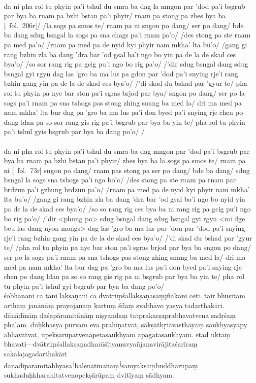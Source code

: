 \documentclass[12pt]{article}
\newcommand{\crux} {\hspace{0em}\textsuperscript{†}\hspace{0em}}
\newcommand{\emdash} {\hspace{0em}—\hspace{0em}}
\begin{document}
\textbf{\TVA}\\
da ni pha rol tu phyin pa'i tshul du smra ba dag la mngon par 'dod pa'i bsgrub par bya ba rnam pa bzhi bstan pa'i phyir/ rnam pa stong pa zhes bya ba [\TVA\ fol.\ 206r]/ /la sogs pa smos te/ rnam pa ni sngon po dang/ ser po dang/ bde ba dang sdug bsngal la sogs pa sna chags pa'i rnam pa'o/ /des stong pa ste rnam pa med pa'o/ /rnam pa med pa de nyid kyi phyir nam mkha' lta bu'o/ /gang gi rang bzhin zla ba dang 'dra bar 'od gsal ba'i ngo bo yin pa de la de skad ces bya'o/ /so sor rang rig pa gcig pu'i ngo bo rig pa'o/ /'dir sdug bsngal dang sdug bsngal gyi rgyu dag las 'gro ba ma lus pa gdon par 'dod pa'i snying rje'i rang bzhin gang yin pa de la de skad ces bya'o/ /'di skad du bshad par 'gyur te/ pha rol tu phyin pa nye bar ston pa'i sgras brjod par bya/ sngon po dang/ ser po la sogs pa'i rnam pa sna tshogs pas stong zhing snang ba med la/ dri ma med pa nam mkha' lta bur dag pa 'gro ba ma lus pa'i don byed pa'i snying rje chen po dang ldan pa so sor rang gis rig pa'i bsgrub par bya ba yin te/ pha rol tu phyin pa'i tshul gyis bsgrub par bya ba dang po'o/ /\\

\textbf{\TVB}\\
da ni pha rol tu phyin pa'i tshul du smra ba dag mngon par 'dod pa'i bsgrub par bya ba rnam pa bzhi bstan pa'i phyir/ zhes bya ba la sogs pa smos te/ rnam pa ni [\TVB\ fol.\ 73r] sngon po dang/ rnam pas stong pa ser po dang/ bde ba dang/ sdug bsngal la sogs sna tshogs pa'i ngo bo'o/ /des stong pa ste rnam pa rnam par brdzun pa'i gzhung brdzun pa'o/ /rnam pa med pa de nyid kyi phyir nam mkha' lta bu'o/ /gang gi rang bzhin zla ba dang 'dra bar 'od gsal ba'i ngo bo nyid yin pa de la de skad ces bya'o/ /so so rang rig ces bya ba ni rang rig pa gcig pu'i ngo bo rig pa'o/ /'dir <phung po> sdug bsngal dang sdug bsngal gyi rgyu <mi dge bcu las dang nyon mongs> dag las 'gro ba ma lus par 'don par 'dod pa'i snying rje'i rang bzhin gang yin pa de la de skad ces bya'o/ /'di skad du bshad par 'gyur te/ /pha rol tu phyin pa nye bar ston pa'i sgras brjod par bya ba sngon po dang/ ser po la sogs pa'i rnam pa sna tshogs pas stong zhing snang ba med la/ dri ma med pa nam mkha' lta bur dag pa 'gro ba ma lus pa'i don byed pa'i snying rje chen po dang ldan pa so so rang gis rig pa ni bsgrub par bya ba yin te/ pha rol tu phyin pa'i tshul gyi bsgrub par bya ba dang po'o/\\

śobhanāni ca tāni lakṣaṇāni ca dvātriṃśallakṣaṇasaṃjñakāni ceti.
tair bhūṣitam.
arthaṃ janānāṃ prayojanaṃ kartuṃ śīlaṃ svabhāvo yasya tadarthakāri.
dānādīnāṃ daśapāramitānāṃ niṣyandaṃ tatprakarṣaprabhavatvena sadṛśaṃ phalam.
duḥkhasya pūrvam eva prahīṇatvāt, sākṣātkṛtāvasthāyāṃ\footnoteB{
	sākṣātkṛtāvasthāyāṃ] \EDD; sākṣātkṛtāvatāsthāyāṃ \MS
} saukhyasyāpy abhāvatvāt, upekṣārūpatvenāpetasaukhyam apagatasaukhyam.
etad uktaṃ bhavati\emdash dvātriṃśallakṣaṇadharāśītyanuvyañjanavirājitaśarīraṃ sakalajagadarthakāri dānādipāramitābhyāsa\crux balenātmānaṃ\footnoteB{
	°balenātmānaṃ] \MS\ \EDD; stobs kyis bdag nyid yang dag par rdzogs pa'i \TVA; stobs kyis byung ba yang dag par \TVB
}\crux samyaksaṃbuddharūpaṃ sukhaduḥkharahitatvenopekṣārūpaṃ dvitīyaṃ sādhyam.\\
\end{document}
